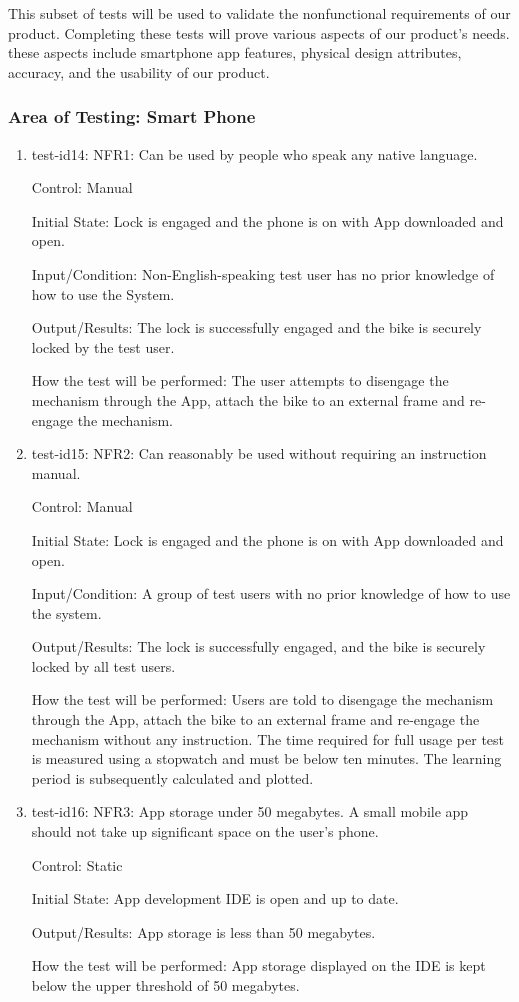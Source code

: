 \documentclass[12pt, titlepage]{article}
\begin{document}
This subset of tests will be used to validate the nonfunctional requirements of our product. Completing these tests will prove various aspects of our product's needs. these aspects include smartphone app features, physical design attributes, accuracy, and the usability of our product.

\subsubsection{Area of Testing: Smart Phone}

\begin{enumerate}

\item{test-id14: NFR1: Can be used by people who speak any native language. \\}

Control: Manual

Initial State: Lock is engaged and the phone is on with App downloaded and open.

Input/Condition: Non-English-speaking test user has no prior knowledge of how to use the System.

Output/Results: The lock is successfully engaged and the bike is securely locked by the test user.

How the test will be performed: The user attempts to disengage the mechanism through the App, attach the bike to an external frame and re-engage the mechanism.
					
\item{test-id15: NFR2: Can reasonably be used without requiring an instruction manual. \\}

Control: Manual

Initial State: Lock is engaged and the phone is on with App downloaded and open.

Input/Condition: A group of test users with no prior knowledge of how to use the system. 

Output/Results: The lock is successfully engaged, and the bike is securely locked by all test users.

How the test will be performed: Users are told to disengage the mechanism through the App, attach the bike to an external frame and re-engage the mechanism without any instruction. The time required for full usage per test is measured using a stopwatch and must be below ten minutes. The learning period is subsequently calculated and plotted. 

\item{test-id16: NFR3: App storage under 50 megabytes. A small mobile app should not take up significant space on the user’s phone.  \\}

Control: Static 

Initial State: App development IDE is open and up to date.

Output/Results: App storage is less than 50 megabytes.

How the test will be performed: App storage displayed on the IDE is kept below the upper threshold of 50 megabytes. 

\end{enumerate}
\end{document}
